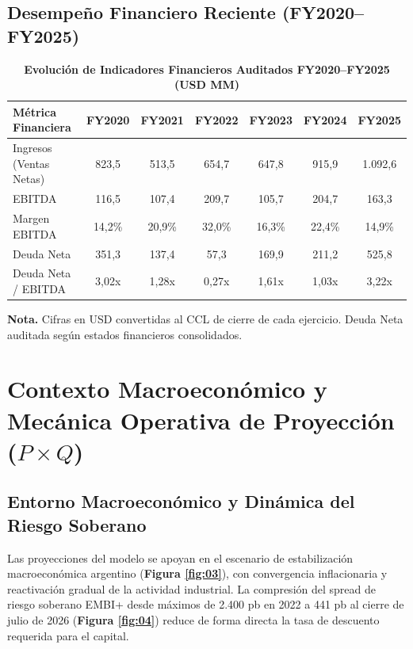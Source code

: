 \documentclass[10pt,a4paper]{article}
\begin{document}
\subsection{Desempeño Financiero Reciente (FY2020--FY2025)}
\begin{table}[H]
\centering
\caption{\textbf{Evolución de Indicadores Financieros Auditados FY2020–FY2025 (USD MM)}}
\small
\begin{tabular}{lcccccc}
\toprule
\textbf{Métrica Financiera} & \textbf{FY2020} & \textbf{FY2021} & \textbf{FY2022} & \textbf{FY2023} & \textbf{FY2024} & \textbf{FY2025} \\
\midrule
Ingresos (Ventas Netas) & 823,5 & 513,5 & 654,7 & 647,8 & 915,9 & 1.092,6 \\
EBITDA & 116,5 & 107,4 & 209,7 & 105,7 & 204,7 & 163,3 \\
Margen EBITDA & 14,2\% & 20,9\% & 32,0\% & 16,3\% & 22,4\% & 14,9\% \\
Deuda Neta & 351,3 & 137,4 & 57,3 & 169,9 & 211,2 & 525,8 \\
Deuda Neta / EBITDA & 3,02x & 1,28x & 0,27x & 1,61x & 1,03x & 3,22x \\
\bottomrule
\end{tabular}
\end{table}

\noindent
{\tiny \textbf{Nota.} Cifras en USD convertidas al CCL de cierre de cada ejercicio. Deuda Neta auditada según estados financieros consolidados.\par}

\section{Contexto Macroeconómico y Mecánica Operativa de Proyección \texorpdfstring{($P \times Q$)}{(P x Q)}}

\subsection{Entorno Macroeconómico y Dinámica del Riesgo Soberano}
Las proyecciones del modelo se apoyan en el escenario de estabilización macroeconómica argentino (\textbf{Figura \ref{fig:03}}), con convergencia inflacionaria y reactivación gradual de la actividad industrial. La compresión del spread de riesgo soberano EMBI+ desde máximos de 2.400 pb en 2022 a 441 pb al cierre de julio de 2026 (\textbf{Figura \ref{fig:04}}) reduce de forma directa la tasa de descuento requerida para el capital.
\end{document}
